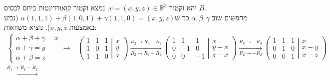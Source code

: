 \documentclass{article}
\def\reals{\mathbb{R}}
\begin{document}
יהא וקטור $v=(x,y,z)\in \reals^3$. נמצא וקטור קואורדינטות ביחס לבסיס $B$. \\
מחפשים שוב $\alpha, \beta, \gamma$ כך ש$\alpha(1,1,1)+\beta(1,0,1)+\gamma(1,1,0)=(x,y,z)$ (נביע באמצעות $x,y,z$). נוציא משוואות:
\begin{align*}
    \begin{cases}
        \alpha + \beta + \gamma = x \\
        \alpha + \gamma = y         \\
        \alpha + \beta = z
    \end{cases}
    \rightarrow                            &
    \left(
    \begin{matrix}
            1 & 1 & 1 \\
            1 & 0 & 1 \\
            1 & 1 & 0
        \end{matrix}
    \left|
    \begin{matrix}
            x \\
            y \\
            z
        \end{matrix}
    \right.
    \right)
    \xrightarrow[R_2\rightarrow R_2-R_1]{R_3\rightarrow R_3-R_1}
    \left(
    \begin{matrix}
            1 & 1  & 1  \\
            0 & -1 & 0  \\
            0 & 0  & -1
        \end{matrix}
    \left|
    \begin{matrix}
            x   \\
            y-x \\
            z-x
        \end{matrix}
    \right.
    \right)
    \xrightarrow[R_2\rightarrow -R_2]{R_3\rightarrow -R_3}
    \left(
    \begin{matrix}
            1 & 1 & 1 \\
            0 & 1 & 0 \\
            0 & 0 & 1
        \end{matrix}
    \left|
    \begin{matrix}
            x   \\
            x-y \\
            x-z
        \end{matrix}
    \right.
    \right)                                  \\
    \xrightarrow[]{R_1\rightarrow R_1-R_2} &

\end{align*}
\end{document}
